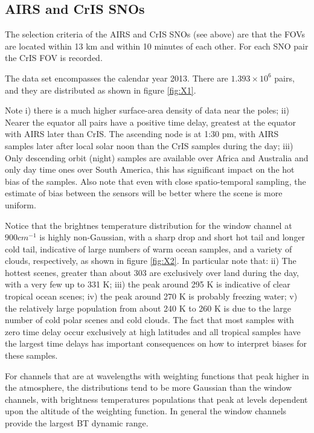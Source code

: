 \documentclass[twocolumn,10pt]{article}
\begin{document}
\subsection{AIRS and CrIS SNOs}

The selection criteria of the AIRS and CrIS SNOs (see above) are that the FOVs are located
within 13 km and within 10 minutes of each other. For each SNO pair the CrIS FOV is recorded. 

The data set encompasses the calendar year 2013. There are $1.393\times 10^{6}$ pairs, and they are distributed as shown in figure \ref{fig:X1}.

Note i) there is a much higher surface-area density of data near the poles; 
ii) Nearer the equator all pairs have a positive time delay, greatest at the equator with AIRS later than CrIS. The ascending node is at 1:30 pm, with
AIRS samples later after local solar noon than the CrIS samples during the day; 
iii) Only descending orbit (night) samples are available over Africa and Australia and only day time ones over South America, this has significant impact on the hot bias of the samples. Also note that even with close spatio-temporal sampling, the estimate of bias between the sensors will be better where the scene is more uniform.

Notice that the brightnes temperature distribution for the window channel at $900 cm^{-1}$ is highly non-Gaussian, with a sharp drop and short hot tail and longer cold tail, indicative of large numbers of warm ocean samples, and a variety of clouds, respectively, as shown in figure \ref{fig:X2}. In particular note that: 
ii) The hottest scenes, greater than about 303 are exclusively over land during the day, with a very few up to 331 K; 
iii) the peak around 295 K is indicative of clear tropical ocean scenes; 
iv) the peak around 270 K is probably freezing water; 
v) the relatively large population from about 240 K to 260 K is due to the large number of cold polar scenes and cold clouds. The fact that most samples with zero time delay occur exclusively at high latitudes and all tropical samples have the largest time delays has important consequences on how to interpret biases for these samples.

For channels that are at wavelengths with weighting functions that peak higher in the atmosphere, the distributions tend to be more Gaussian than the window channels, with brightness temperatures populations that peak at levels dependent upon the altitude of the weighting function. In general the window channels provide the largest BT dynamic range.
\end{document}
